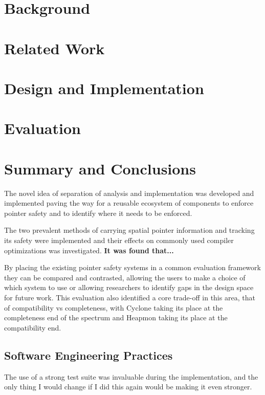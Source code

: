 \documentclass[a4paper,12pt,twoside,openright]{report}
\begin{document}
\chapter{Background} 


\chapter{Related Work} 


\chapter{Design and Implementation} 


\chapter{Evaluation} 


\chapter{Summary and Conclusions} 

The novel idea of separation of analysis and implementation was developed and implemented paving the way for a reusable ecosystem of components to enforce pointer safety and to identify where it needs to be enforced.

The two prevalent methods of carrying spatial pointer information and tracking its safety were implemented and their effects on commonly used compiler optimizations was investigated.
\textbf{It was found that...}

By placing the existing pointer safety systems in a common evaluation framework they can be compared and contrasted, allowing the users to make a choice of which system to use or allowing researchers to identify gaps in the design space for future work.
This evaluation also identified a core trade-off in this area, that of compatibility vs completeness, with Cyclone taking its place at the completeness end of the spectrum and Heapmon taking its place at the compatibility end.

\section{Software Engineering Practices}

The use of a strong test suite was invaluable during the implementation, and the only thing I would change if I did this again would be making it even stronger.
\end{document}
